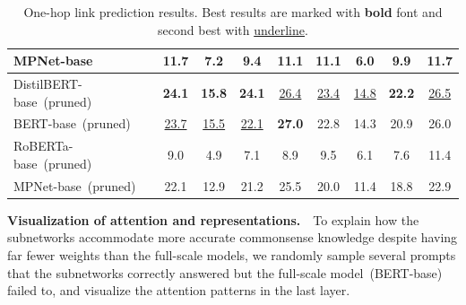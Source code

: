 \begin{table}[t!]
\begin{tabular}{l|cccc|cccc}
		MPNet-base &11.7 &7.2 &9.4 &11.1 &11.1 &6.0 &9.9 &11.7 \\
		\midrule
		DistilBERT-base~(pruned) &\textbf{24.1} &\textbf{15.8} &\textbf{24.1} &\underline{26.4} &\underline{23.4} &\underline{14.8} &\textbf{22.2} &\underline{26.5} \\
		BERT-base~(pruned) &\underline{23.7} &\underline{15.5} &\underline{22.1} &\textbf{27.0} &22.8 &14.3 &20.9 &26.0 \\
		RoBERTa-base~(pruned) &9.0 &4.9 &7.1 &8.9 &9.5 &6.1 &7.6 &11.4 \\
		MPNet-base~(pruned) &22.1 &12.9 &21.2 &25.5 &20.0 &11.4 &18.8 &22.9 \\
		\bottomrule
	\end{tabular}
	\caption{One-hop link prediction results. Best results are marked with \textbf{bold} font and second best with \underline{underline}.}
	\label{table:linkprediction}
\end{table}

\noindent
\textbf{Visualization of attention and representations.}~~To explain 
how the subnetworks accommodate more accurate commonsense knowledge despite 
having far fewer weights than the full-scale models, we randomly 
sample several prompts that the subnetworks correctly answered but 
the full-scale model~(BERT-base) failed to, and 
visualize the attention patterns in the last layer.

